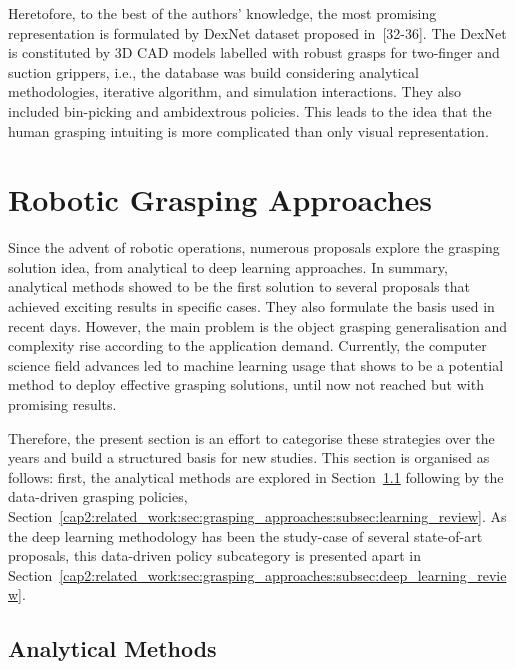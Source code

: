 Heretofore, to the best of the authors' knowledge, the most promising representation is formulated by DexNet dataset proposed in~[32-36]. The DexNet is constituted by 3D CAD models labelled with robust grasps for two-finger and suction grippers, i.e., the database was build considering analytical methodologies, iterative algorithm, and simulation interactions. They also included bin-picking and ambidextrous policies. This leads to the idea that the human grasping intuiting is more complicated than only visual representation.



\section{Robotic Grasping Approaches}
\label{cap2:related_work:sec:grasping_approaches}

Since the advent of robotic operations, numerous proposals explore the grasping solution idea, from analytical to deep learning approaches. In summary, analytical methods showed to be the first solution to several proposals that achieved exciting results in specific cases. They also formulate the basis used in recent days. However, the main problem is the object grasping generalisation and complexity rise according to the application demand. Currently, the computer science field advances led to machine learning usage that shows to be a potential method to deploy effective grasping solutions, until now not reached but with promising results. 

Therefore, the present section is an effort to categorise these strategies over the years and build a structured basis for new studies. This section is organised as follows: first, the analytical methods are explored in Section~\ref{cap2:related_work:sec:grasping_approaches:subsec:analytical_review} following by the data-driven grasping policies, Section~\ref{cap2:related_work:sec:grasping_approaches:subsec:learning_review}. As the deep learning methodology has been the study-case of several state-of-art proposals, this data-driven policy subcategory is presented apart in Section~\ref{cap2:related_work:sec:grasping_approaches:subsec:deep_learning_review}.

\subsection{Analytical Methods}
\label{cap2:related_work:sec:grasping_approaches:subsec:analytical_review}

